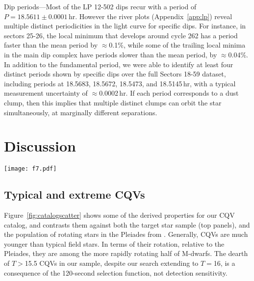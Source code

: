 \documentclass[11pt,twocolumn,tighten]{aastex63}
\begin{document}
{\sc Dip periods}---Most of the LP 12-502 dips recur with a period of
$P=18.5611 \pm 0.0001$\,hr.  However the river plots
(Appendix~\ref{app:lp}) reveal multiple distinct periodicities in the
light curve for specific dips.  For instance, in sectors 25-26, the
local minimum that develops around cycle 262 has a period faster than
the mean period by $\approx$0.1\%, while some of the trailing local
minima in the main dip complex have periods slower than the mean
period, by $\approx$0.04\%.  In addition to the fundamental period, we
were able to identify at least four distinct periods shown by specific
dips over the full Sectors 18-59 dataset, including periods at
18.5683, 18.5672, 18.5473, and 18.5145\,hr, with a typical measurement
uncertainty of $\approx$0.0002\,hr.  If each period corresponds to a
dust clump, then this implies that multiple distinct clumps can orbit
the star simultaneously, at marginally different separations.






\section{Discussion}
\label{sec:discussion}

\begin{figure*}[!t]
	\begin{center}
		\centering
		\texttt{[image: f7.pdf]}
		\vspace{-0.1cm}
		\caption{
      {\bf Properties of CQVs identified by our search}.
      The \ngoods\ bonafide CQVs in Table~\ref{tab:thetable} are 
      the dark blue circles; \nmaybes\ ambiguous CQV candidates are light blue circles.
      The top panels show the \nstarssearched\ target stars with 120-second cadence TESS data
      as the shaded gray background;
      darker regions correspond to a larger relative number of searched stars.
      The lower-left panel compares the rotation--color distribution of CQVs against the rotation
      periods of K- and M-dwarfs in the Pleiades from \citet{2016AJ....152..114R}.
      The lower-middle panel plots the derived corotation radii
      $R_{\rm cr} = (GM/\Omega^2)^{1/3}$ in units of stellar radii against the measured
      CQV periods, in units of hours.
		}
		\label{fig:catalogscatter}
	\end{center}
\end{figure*}


\subsection{Typical and extreme CQVs}
\label{subsec:extreme}
Figure~\ref{fig:catalogscatter} shows some of the derived properties
for our CQV catalog, and contrasts them against both the target star
sample (top panels), and the population of rotating stars in the Pleiades
from \citet{2016AJ....152..114R}.
Generally, CQVs are much younger than typical field stars. 
In terms of their rotation, relative to the Pleiades,
they are among the more rapidly rotating half of M-dwarfs.
The dearth of $T$$>$15.5 CQVs in our sample, despite our search extending
to $T$$=$16, is a consequence of the 120-second selection function,
not detection sensitivity.
\end{document}
